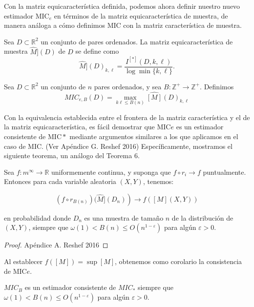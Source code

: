	Con la matriz equicaracterística definida, podemos ahora definir nuestro nuevo estimador $\mathrm{MIC}_e$ en términos de la matriz equicaracterística de muestra, de manera análoga a cómo definimos MIC con la matriz característica de muestra.

	\begin{defn}
		Sea $D \subset \mathbb{R}^2$ un conjunto de pares ordenados. La matriz equicaracterística de muestra $\widehat{M}](D)$ de $D$ se define como
		$$
		\widehat{M}](D)_{k, \ell}=\frac{I^{[*]}(D, k, \ell)}{\log \min \{k, \ell\}} .
		$$
	\end{defn}
	\begin{defn}
		Sea $D \subset \mathbb{R}^2$ un conjunto de $n$ pares ordenados, y sea $B: \mathbb{Z}^{+} \rightarrow \mathbb{Z}^{+}$. Definimos
		$$
		M I C_{e, B}(D)=\max _{k \ell \leq B(n)} \widehat{[M]}(D)_{k, \ell}
		$$
	\end{defn}



	Con la equivalencia establecida entre el frontera de la matriz característica y el de la matriz equicaracterística, es fácil demostrar que $\mathrm{MIC}e$ es un estimador consistente de $\mathrm{MIC}*$ mediante argumentos similares a los que aplicamos en el caso de MIC. (Ver Apéndice G. Reshef 2016) Específicamente, mostramos el siguiente teorema, un análogo del Teorema 6.
	
	\begin{thm}
		Sea $f: m^{\infty} \rightarrow \mathbb{R}$ uniformemente continua, y suponga que $f \circ r_i \rightarrow f$ puntualmente. Entonces para cada variable aleatoria $(X, Y)$, tenemos:

		$$
		\left.\left(f \circ r_{B(n)}\right)(\widehat{M}]\left(D_n\right)\right) \rightarrow f([M](X, Y))
		$$

		en probabilidad donde $D_n$ es una muestra de tamaño $n$ de la distribución de $(X, Y)$, siempre que $\omega(1)<B(n) \leq O\left(n^{1-\varepsilon}\right)$ para algún $\varepsilon>0$.
	\end{thm}
	\begin{proof}
		Apéndice A. Reshef 2016
	\end{proof}

	Al establecer $f([M])=\sup [M]$, obtenemos como corolario la consistencia de $\mathrm{MIC}e$.
	
	\begin{cor}
		$M I C_{B}$ es un estimador consistente de $M I C_*$ siempre que $\omega(1)<B(n) \leq O\left(n^{1-\varepsilon}\right)$ para algún $\varepsilon>0$.
	\end{cor}
	

